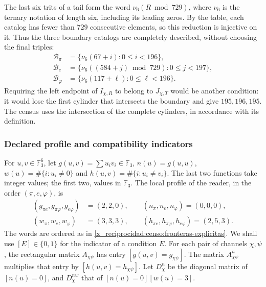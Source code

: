 The last six trits of a tail form the word
\(\nu_6(R\bmod729)\), where \(\nu_6\) is the ternary notation
of length six, including its leading zeros. By the table, each
catalog has fewer than \(729\) consecutive elements, so
this reduction is injective on it. Thus the three boundary catalogs
are completely described, without choosing the final triples:
\begin{equation}
 \begin{split}
 \mathcal B_\pi&=\{\nu_6(67+i):0\leq i<196\},\\
 \mathcal B_e&=\{\nu_6((584+j)\bmod729):0\leq j<197\},\\
 \mathcal B_\varphi&=\{\nu_6(117+\ell):0\leq\ell<196\}.
 \end{split}
 \label{x_reciprocidad:censo:fronteras-explicitas}
\end{equation}
Requiring the left endpoint of \(I_{\chi,R}\) to belong to
\(J_{\chi,T}\) would be another condition: it would lose the first cylinder
that intersects the boundary and give \(195,196,195\). The census uses the
intersection of the complete cylinders, in accordance with its definition.

\subsubsection{Declared profile and compatibility indicators}

For \(u,v\in\mathbb F_3^6\), let
\(g(u,v)=\sum u_iv_i\in\mathbb F_3\),
\(n(u)=g(u,u)\), \(w(u)=\#\{i:u_i\ne0\}\) and
\(h(u,v)=\#\{i:u_i\ne v_i\}\). The last two functions take
integer values; the first two, values in \(\mathbb F_3\).
The local profile of the reader, in the order \((\pi,e,\varphi)\), is
\begin{equation}
 \begin{split}
 (g_{\pi e},g_{\pi\varphi},g_{e\varphi})&=(2,2,0),\qquad
 (n_\pi,n_e,n_\varphi)=(0,0,0),\\
 (w_\pi,w_e,w_\varphi)&=(3,3,3),\qquad
 (h_{\pi e},h_{\pi\varphi},h_{e\varphi})=(2,5,3).
 \end{split}
 \label{x_reciprocidad:censo:perfil-local}
\end{equation}
The words are ordered as in \eqref{x_reciprocidad:censo:fronteras-explicitas}.
We shall use \([E]\in\{0,1\}\) for the indicator of a condition \(E\).
For each pair of channels \(\chi,\psi\), the rectangular matrix
\(A_{\chi\psi}\) has entry \([g(u,v)=g_{\chi\psi}]\).
The matrix \(A^{h}_{\chi\psi}\) multiplies that entry by
\([h(u,v)=h_{\chi\psi}]\). Let \(D_\chi^n\) be the diagonal matrix
of \([n(u)=0]\), and \(D_\chi^{nw}\) that of
\([n(u)=0][w(u)=3]\).

